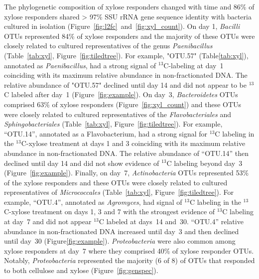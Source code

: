 The phylogenetic composition of xylose responders changed with time and 
86\% of xylose responders shared > 97\% SSU rRNA gene sequence
identity with bacteria cultured in isolation
(Figure~\ref{fig:l2fc}~and~\ref{fig:xyl_count}). On day 1, \textit{Bacilli}
OTUs represented 84\% of xylose responders and the majority of these OTUs were
closely related to cultured representatives of the genus \textit{Paenibacillus}
(Table~\ref{tab:xyl}, Figure~\ref{fig:tiledtree}). For example, "OTU.57"
(Table\ref{tab:xyl}), annotated as \textit{Paenibacillus}, had a strong signal
of $^{13}$C-labeling at day~1 coinciding with its maximum relative abundance in
non-fractionated DNA. The relative abundance of "OTU.57" declined until day 14
and did not appear to be $^{13}$C labeled after day~1
(Figure~\ref{fig:example}). On day~3, \textit{Bacteroidetes} OTUs comprised
63\% of xylose responders (Figure~\ref{fig:xyl_count}) and these OTUs were
closely related to cultured representatives of the \textit{Flavobacteriales}
and \textit{Sphingobacteriales} (Table~\ref{tab:xyl},
Figure~\ref{fig:tiledtree}). For example, ``OTU.14'', annotated as
a Flavobacterium, had a strong signal for $^{13}$C labeling in the
$^{13}$C-xylose treatment at days 1 and 3 coinciding with its maximum relative
abundance in non-fractionated DNA. The relative abundance of ``OTU.14'' then
declined until day 14 and did not show evidence of $^{13}$C labeling beyond
day~3 (Figure~\ref{fig:example}). Finally, on day~7, \textit{Actinobacteria}
OTUs represented 53\% of the xylose responders and these OTUs were closely
related to cultured representatives of \textit{Micrococcales}
(Table~\ref{tab:xyl}, Figure~\ref{fig:tiledtree}). For example, ``OTU.4'',
annotated as \textit{Agromyces}, had signal of $^{13}$C labeling in the
$^{13}$C-xylose treatment on days 1,
3 and 7 with the strongest evidence of $^{13}$C labeling at day~7 and did not
appear $^{13}$C labeled at days~14 and~30. ``OTU.4'' relative abundance in
non-fractionated DNA increased until day~3 and then declined until
day~30 (Figure\ref{fig:example}). \textit{Proteobacteria} were also common
among xylose responders at day~7 where they comprised 40\% of xylose responder
OTUs. Notably, \textit{Proteobacteria} represented the majority (6 of 8) of
OTUs that responded to both cellulose and xylose (Figure~\ref{fig:genspec}). 


